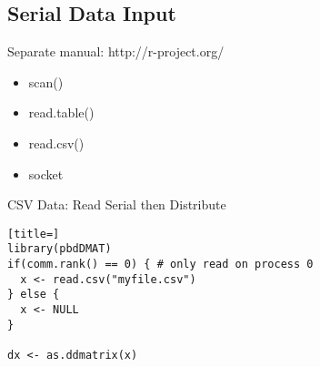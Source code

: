 \subsection{Serial Data Input}
\makesubcontentsslidessec


\begin{frame}
\begin{block}{Separate manual: http://r-project.org/}
\begin{itemize}
\item scan()
\item read.table()
\item read.csv()
\item socket
\end{itemize}
\end{block}
\end{frame}

\begin{frame}[fragile]
  \begin{exampleblock}{CSV Data: Read Serial then Distribute}\pause
\begin{lstlisting}[title=]
library(pbdDMAT)
if(comm.rank() == 0) { # only read on process 0
  x <- read.csv("myfile.csv")
} else {
  x <- NULL
}

dx <- as.ddmatrix(x)
\end{lstlisting}
  \end{exampleblock}
\end{frame}
